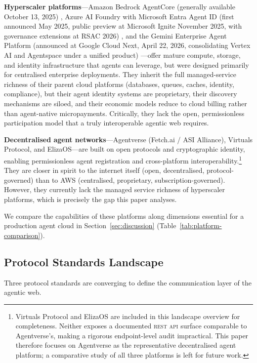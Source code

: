 \documentclass[twoside,11pt]{article}
\begin{document}
\textbf{Hyperscaler platforms}---Amazon Bedrock AgentCore (generally available
October 13, 2025) \citep{aws2025bedrock}, Azure AI Foundry with Microsoft
Entra Agent ID (first announced May 2025, public preview at Microsoft Ignite
November 2025, with governance extensions at RSAC 2026) \citep{microsoft2025entra}, and the Gemini
Enterprise Agent Platform (announced at Google Cloud Next, April 22, 2026,
consolidating Vertex AI and Agentspace under a unified product)
\citep{google2026next}---offer mature compute, storage, and identity
infrastructure that agents can leverage, but were designed primarily for
centralised enterprise deployments.  They inherit the full managed-service
richness of their parent cloud platforms (databases, queues, caches, identity,
compliance), but their agent identity systems are proprietary, their discovery
mechanisms are siloed, and their economic models reduce to cloud billing rather
than agent-native micropayments.  Critically, they lack the open, permissionless
participation model that a truly interoperable agentic web requires.

\textbf{Decentralised agent networks}---Agentverse (Fetch.ai / ASI Alliance),
Virtuals Protocol, and ElizaOS---are built on open protocols and cryptographic
identity, enabling permissionless agent registration and cross-platform
interoperability.\footnote{Virtuals Protocol and ElizaOS are included in this
landscape overview for completeness.  Neither exposes a documented \textsc{rest}
\textsc{api} surface comparable to Agentverse's, making a rigorous
endpoint-level audit impractical.  This paper therefore focuses on Agentverse
as the representative decentralised agent platform; a comparative study of
all three platforms is left for future work.}  They are closer in spirit to
the internet itself (open, decentralised, protocol-governed) than to AWS
(centralised, proprietary, subscription-governed).  However, they currently
lack the managed service richness of hyperscaler platforms, which is precisely
the gap this paper analyses.

We compare the capabilities of these platforms along dimensions essential for
a production agent cloud in Section~\ref{sec:discussion}
(Table~\ref{tab:platform-comparison}).

\subsection{Protocol Standards Landscape}
\label{subsec:protocols}

Three protocol standards are converging to define the communication layer of
the agentic web.
\end{document}
